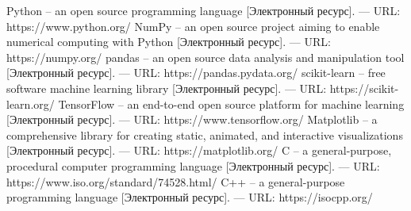 \documentclass[a4paper,article,14pt]{extarticle}
\begin{document}
\begin{thebibliography}{1}
 Python -- an open source programming language [Электронный ресурс]. — URL: https://www.python.org/
 NumPy -- an open source project aiming to enable numerical computing with Python [Электронный ресурс]. — URL: https://numpy.org/
 pandas -- an open source data analysis and manipulation tool [Электронный ресурс]. — URL: https://pandas.pydata.org/
 scikit-learn -- free software machine learning library [Электронный ресурс]. — URL: https://scikit-learn.org/
 TensorFlow -- an end-to-end open source platform for machine learning [Электронный ресурс]. — URL: https://www.tensorflow.org/
 Matplotlib -- a comprehensive library for creating static, animated, and interactive visualizations [Электронный ресурс]. — URL: https://matplotlib.org/
 C -- a general-purpose, procedural computer programming language [Электронный ресурс]. — URL: https://www.iso.org/standard/74528.html/
 C++ -- a general-purpose programming language [Электронный ресурс]. — URL: https://isocpp.org/
\end{thebibliography}
\end{document}
